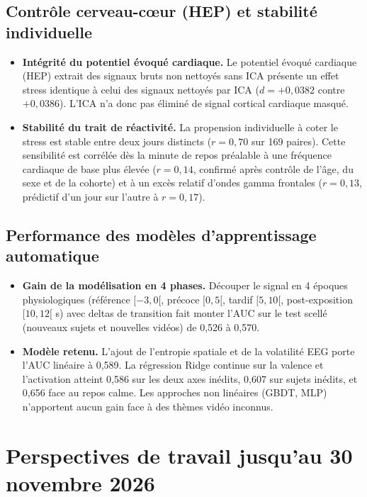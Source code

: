 \documentclass[10pt,a4paper]{article}
\begin{document}
\subsection{Contrôle cerveau-cœur (HEP) et stabilité individuelle}
\begin{itemize}
  \item \textbf{Intégrité du potentiel évoqué cardiaque.} Le potentiel évoqué cardiaque (HEP) extrait des signaux bruts non nettoyés sans ICA présente un effet stress identique à celui des signaux nettoyés par ICA ($d = +0,0382$ contre $+0,0386$). L'ICA n'a donc pas éliminé de signal cortical cardiaque masqué.
  \item \textbf{Stabilité du trait de réactivité.} La propension individuelle à coter le stress est stable entre deux jours distincts ($r = 0,70$ sur 169 paires). Cette sensibilité est corrélée dès la minute de repos préalable à une fréquence cardiaque de base plus élevée ($r = 0,14$, confirmé après contrôle de l'âge, du sexe et de la cohorte) et à un excès relatif d'ondes gamma frontales ($r = 0,13$, prédictif d'un jour sur l'autre à $r = 0,17$).
\end{itemize}

\subsection{Performance des modèles d'apprentissage automatique}
\begin{itemize}
  \item \textbf{Gain de la modélisation en 4 phases.} Découper le signal en 4 époques physiologiques (référence $[-3, 0[$, précoce $[0, 5[$, tardif $[5, 10[$, post-exposition $[10, 12[$ s) avec deltas de transition fait monter l'AUC sur le test scellé (nouveaux sujets et nouvelles vidéos) de 0,526 à 0,570.
  \item \textbf{Modèle retenu.} L'ajout de l'entropie spatiale et de la volatilité EEG porte l'AUC linéaire à 0,589. La régression Ridge continue sur la valence et l'activation atteint 0,586 sur les deux axes inédits, 0,607 sur sujets inédits, et 0,656 face au repos calme. Les approches non linéaires (GBDT, MLP) n'apportent aucun gain face à des thèmes vidéo inconnus.
\end{itemize}

\section{Perspectives de travail jusqu'au 30 novembre 2026}
\end{document}
